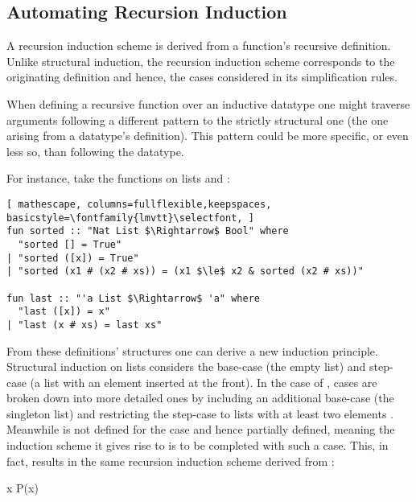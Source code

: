 \subsection{Automating Recursion Induction}
\label{sec:rec-ind}
A recursion induction scheme is derived from a function's recursive definition.
Unlike structural induction, the recursion induction scheme corresponds to the originating definition and hence, the cases considered in its simplification rules.

When defining a recursive function over an inductive datatype one might traverse arguments following a different pattern to the strictly structural one (the one arising from a datatype's definition). This pattern could be more specific, or even less so, than following the datatype.

For instance, take the functions on lists  and :

\begin{lstlisting}[ mathescape, columns=fullflexible,keepspaces, basicstyle=\fontfamily{lmvtt}\selectfont, ]
fun sorted :: "Nat List $\Rightarrow$ Bool" where
  "sorted [] = True"
| "sorted ([x]) = True"
| "sorted (x1 # (x2 # xs)) = (x1 $\le$ x2 & sorted (x2 # xs))"

fun last :: "'a List $\Rightarrow$ 'a" where
  "last ([x]) = x"
| "last (x # xs) = last xs"
\end{lstlisting}

\noindent From these definitions' structures one can derive a new induction principle.
Structural induction on lists considers the base-case \isaCode{[]} (the empty list) and step-case  (a list with an element inserted at the front).
In the case of , cases are broken down into more detailed ones by including an additional base-case \isaCode{[x]} (the singleton list) and restricting the step-case to lists with at least two elements .
Meanwhile  is not defined for the case \isaCode{[]} and hence partially defined, meaning the induction scheme it gives rise to is to be completed with such a case.
This, in fact, results in the same recursion induction scheme derived from :

\vspace{2 mm}

  {\forall x \;\; P\;(x)}

